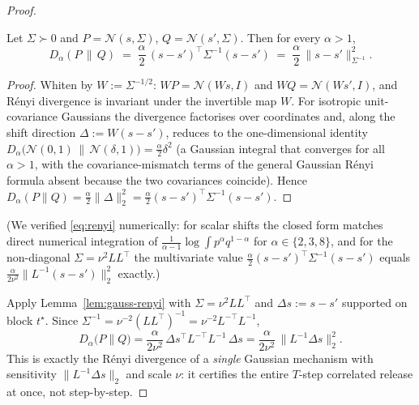 \begin{proof}
\begin{lemma}
\label{lem:gauss-renyi}
Let $\Sigma\succ0$ and $P=\mathcal N(s,\Sigma)$, $Q=\mathcal N(s',\Sigma)$. Then for every
$\alpha>1$,
\begin{equation}
D_\alpha(P\,\|\,Q)\;=\;\frac{\alpha}{2}\,(s-s')^\top \Sigma^{-1}(s-s')
\;=\;\frac{\alpha}{2}\,\big\|s-s'\big\|_{\Sigma^{-1}}^{2}.
\label{eq:renyi}
\end{equation}
\end{lemma}
\begin{proof}
Whiten by $W:=\Sigma^{-1/2}$: $WP=\mathcal N(Ws,I)$ and $WQ=\mathcal N(Ws',I)$, and R\'enyi
divergence is invariant under the invertible map $W$. For isotropic unit-covariance Gaussians the
divergence factorises over coordinates and, along the shift direction $\Delta:=W(s-s')$, reduces to
the one-dimensional identity $D_\alpha\big(\mathcal N(0,1)\,\|\,\mathcal N(\delta,1)\big)
=\tfrac{\alpha}{2}\delta^2$ (a Gaussian integral that converges for all $\alpha>1$, with the
covariance-mismatch terms of the general Gaussian R\'enyi formula absent because the two covariances
coincide). Hence $D_\alpha(P\|Q)=\tfrac{\alpha}{2}\|\Delta\|_2^2=\tfrac{\alpha}{2}(s-s')^\top\Sigma^{-1}(s-s')$.
\end{proof}

\noindent
(We verified \eqref{eq:renyi} numerically: for scalar shifts the closed form matches direct numerical
integration of $\tfrac1{\alpha-1}\log\!\int p^\alpha q^{1-\alpha}$ for $\alpha\in\{2,3,8\}$, and for the
non-diagonal $\Sigma=\nu^2LL^\top$ the multivariate value $\tfrac\alpha2(s-s')^\top\Sigma^{-1}(s-s')$
equals $\tfrac{\alpha}{2\nu^2}\|L^{-1}(s-s')\|_2^2$ exactly.)

Apply Lemma~\ref{lem:gauss-renyi} with $\Sigma=\nu^2 LL^\top$ and $\Delta s:=s-s'$ supported on block
$t^\star$. Since $\Sigma^{-1}=\nu^{-2}(LL^\top)^{-1}=\nu^{-2}L^{-\top}L^{-1}$,
\begin{equation}
D_\alpha\big(P\|Q\big)
=\frac{\alpha}{2\nu^{2}}\,\Delta s^\top L^{-\top}L^{-1}\,\Delta s
=\frac{\alpha}{2\nu^{2}}\,\big\|L^{-1}\Delta s\big\|_2^{2}.
\label{eq:renyi-mahal}
\end{equation}
This is exactly the R\'enyi divergence of a \emph{single} Gaussian mechanism with sensitivity
$\|L^{-1}\Delta s\|_2$ and scale $\nu$: it certifies the entire $T$-step correlated release at once,
not step-by-step.


\end{proof}
